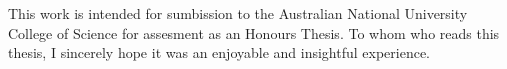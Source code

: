 \vspace*{7cm}
\noindent This work is intended for sumbission to the Australian National University College of Science for assesment as an Honours Thesis. To whom who reads this thesis, I sincerely hope it was an enjoyable and insightful experience.

\vspace*{4cm}